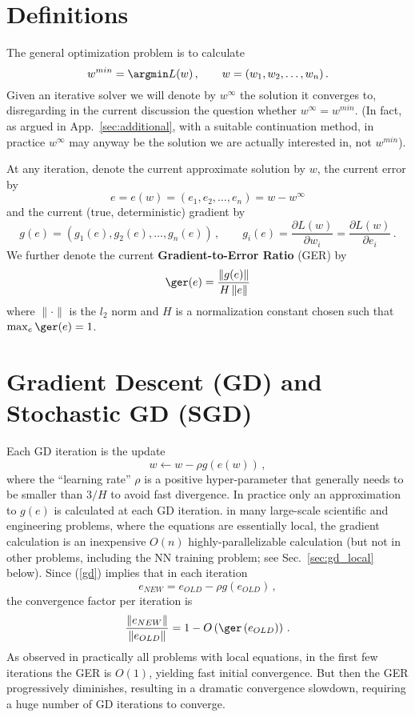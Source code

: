 \documentclass{article} %
\begin{document}

\section{Definitions}
\label{sec:definitions}
The general optimization problem is to calculate
$$
	w^{min} = \argmin L(w)\,,\qquad w = (w_1, w_2,\dots, w_n)\,.
$$
Given an iterative solver we will denote by $w^{\infty}$ the solution it converges to, disregarding in the current discussion the question whether $w^{\infty} = w^{min}$. (In fact, as argued in App.~\ref{sec:additional}, with a suitable continuation method, in practice $w^{\infty}$ may anyway be the solution we are actually interested in, not $w^{min}$).

At any iteration, denote the current approximate solution by $w$, the current error by
\begin{equation}
	e = e(w) = (e_1, e_2, \dots, e_n) = w - w^{\infty}
	\label{error}
\end{equation}
and the current (true, deterministic) gradient by
$$
	g(e) = \left(g_1(e), g_2(e), \dots, g_n(e)\right)\,,\qquad g_i(e) = \frac{\partial L(w)}{\partial w_i} = \frac{\partial L(w)}{\partial e_i}\,.
$$
We further denote the current \textbf{Gradient-to-Error Ratio} (GER) by
\begin{equation}
	\ger(e) = \frac{\left\| g(e) \right\|}{H \left\| e \right\|}
	\label{ger}
\end{equation}
where $\|\cdot\|$ is the $l_2$ norm and $H$ is a normalization constant chosen such that $\max_e \ger(e) = 1$.

\section{Gradient Descent (GD) and Stochastic GD (SGD)}
\label{sec:gd}

Each GD iteration is the update
\begin{equation}
	w \longleftarrow w - \rho g\left(e(w)\right)\,,
	\label{gd}
\end{equation}
where the ``learning rate'' $\rho$ is a positive hyper-parameter that generally needs to be smaller than $3 / H$ to avoid fast divergence. In practice only an approximation to $g(e)$ is calculated at each GD iteration. in many large-scale scientific and engineering problems, where the equations are essentially local, the gradient calculation is an inexpensive $O(n)$ highly-parallelizable calculation (but not in other problems, including the NN training problem; see Sec.~\ref{sec:gd_local} below). Since (\ref{gd}) implies that in each iteration
$$
	e_{NEW} = e_{OLD} - \rho g\left(e_{OLD}\right)\,,
$$
the convergence factor per iteration is
$$
	\frac{\left\|e_{NEW}\right\|}{\left\|e_{OLD}\right\|} = 1 - O\left(\ger\left(e_{OLD}\right)\right)\,.
$$
As observed in practically all problems with local equations, in the first few iterations the GER is $O(1)$, yielding fast initial convergence. But then the GER progressively diminishes, resulting in a dramatic convergence slowdown, requiring a huge number of GD iterations to converge.
\end{document}

